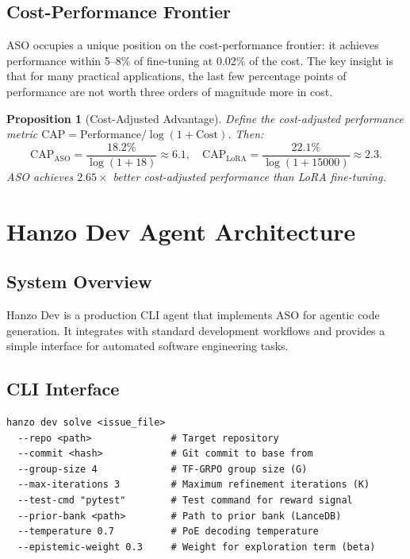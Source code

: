\documentclass[11pt]{article}
\newtheorem{proposition}[theorem]{Proposition}
\begin{document}
\subsection{Cost-Performance Frontier}

ASO occupies a unique position on the cost-performance frontier: it achieves
performance within 5--8\% of fine-tuning at 0.02\% of the cost. The key insight
is that for many practical applications, the last few percentage points of
performance are not worth three orders of magnitude more in cost.

\begin{proposition}[Cost-Adjusted Advantage]
Define the cost-adjusted performance metric $\text{CAP} = \text{Performance} / \log(1 + \text{Cost})$. Then:
\begin{equation}
    \text{CAP}_{\text{ASO}} = \frac{18.2\%}{\log(1 + 18)} \approx 6.1,
    \quad
    \text{CAP}_{\text{LoRA}} = \frac{22.1\%}{\log(1 + 15000)} \approx 2.3.
\end{equation}
ASO achieves $2.65\times$ better cost-adjusted performance than LoRA fine-tuning.
\end{proposition}

\section{Hanzo Dev Agent Architecture}
\label{sec:agent}

\subsection{System Overview}

Hanzo Dev is a production CLI agent that implements ASO for agentic code
generation. It integrates with standard development workflows and provides a
simple interface for automated software engineering tasks.

\subsection{CLI Interface}

\begin{verbatim}
hanzo dev solve <issue_file>
  --repo <path>              # Target repository
  --commit <hash>            # Git commit to base from
  --group-size 4             # TF-GRPO group size (G)
  --max-iterations 3         # Maximum refinement iterations (K)
  --test-cmd "pytest"        # Test command for reward signal
  --prior-bank <path>        # Path to prior bank (LanceDB)
  --temperature 0.7          # PoE decoding temperature
  --epistemic-weight 0.3     # Weight for exploration term (beta)
\end{verbatim}
\end{document}
